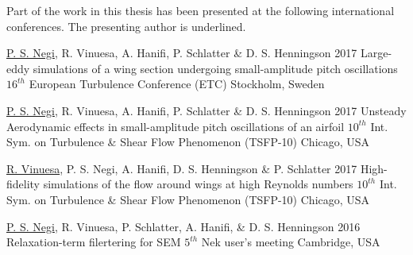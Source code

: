 

%
\begin{conferences}
	Part of the work in this thesis has been presented at the following 
	international conferences. The presenting author is underlined.

  \conferenceitem%
  {\underline{P. S. Negi}, R. Vinuesa, A. Hanifi, P. Schlatter \& D. S. Henningson}%
  {2017}%
  {Large-eddy simulations of a wing section undergoing small-amplitude pitch oscillations}%
  {$16^{th}$ European Turbulence Conference (ETC)}%
  {Stockholm, Sweden}%


  \conferenceitem%
  {\underline{P. S. Negi}, R. Vinuesa, A. Hanifi, P. Schlatter \& D. S. Henningson}%
  {2017}%
  {Unsteady Aerodynamic effects in small-amplitude pitch oscillations of an airfoil}%
  {$10^{th}$ Int. Sym. on Turbulence \& Shear Flow Phenomenon (TSFP-10)}%
  {Chicago, USA}%

  \conferenceitem%
  {\underline{R. Vinuesa}, P. S. Negi, A. Hanifi, D. S. Henningson \& P. Schlatter}%
  {2017}%
  {High-fidelity simulations of the flow around wings at high Reynolds numbers}%
  {$10^{th}$ Int. Sym. on Turbulence \& Shear Flow Phenomenon (TSFP-10)}%
  {Chicago, USA}%
  
  \conferenceitem%
  {\underline{P. S. Negi}, R. Vinuesa, P. Schlatter, A. Hanifi, \& D. S. Henningson}%
  {2016}%
  {Relaxation-term filertering for SEM}%
  {$5^{th}$ Nek user's meeting}%
  {Cambridge, USA}%

\end{conferences}


%
\tableofcontents
